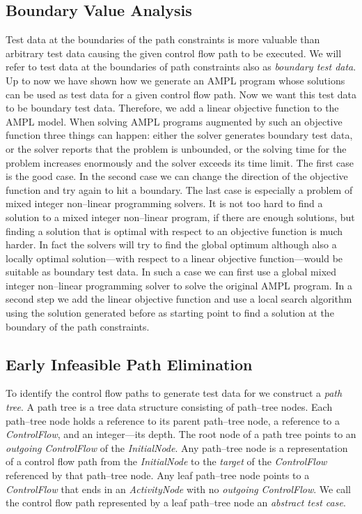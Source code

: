 \documentclass[runningheads,a4paper]{llncs}%
\newcommand{\UMLType}[1]{\textsf{\textit{#1}}} %
\newcommand{\UMLReference}[1]{\textsf{\textit{#1}}} %
\begin{document}
\subsection{Boundary Value Analysis}%
\label{sec:BoundaryValueAnalysis}%
Test data at the boundaries of the path constraints is more valuable than
arbitrary test data causing the given control flow path to be executed. We will
refer to test data at the boundaries of path constraints also as \emph{boundary
test data}. Up to now we have shown how we generate an AMPL program whose
solutions can be used as test data for a given control flow path. Now we want
this test data to be boundary test data. Therefore, we add a linear objective
function to the AMPL model. When solving AMPL programs augmented by such an
objective function three things can happen: either the solver generates boundary
test data, or the solver reports that the problem is unbounded, or the solving
time for the problem increases enormously and the solver exceeds its time limit.
The first case is the good case. In the second case we can change the direction
of the objective function and try again to hit a boundary. The last case is
especially a problem of mixed integer non--linear programming solvers. It is not
too hard to find a solution to a mixed integer non--linear program, if there are
enough solutions, but finding a solution that is optimal with respect to an
objective function is much harder. In fact the solvers will try to find the
global optimum although also a locally optimal solution---with respect to a
linear objective function---would be suitable as boundary test data. In such a
case we can first use a global mixed integer non--linear programming solver to
solve the original AMPL program. In a second step we add the linear objective
function and use a local search algorithm using the solution generated before as
starting point to find a solution at the boundary of the path constraints.
\subsection{Early Infeasible Path Elimination}%
\label{sec:InfeasiblePathElimination}%
To identify the control flow paths to generate test data for we construct a
\emph{path tree}. A path tree is a tree data structure consisting of path--tree
nodes. Each path--tree node holds a reference to its parent path--tree node, a
reference to a \UMLType{ControlFlow}, and an integer---its depth. The root node
of a path tree points to an \UMLReference{outgoing} \UMLType{ControlFlow} of the
\UMLType{InitialNode}. Any path--tree node is a representation of a
control flow path from the \UMLType{InitialNode} to the \UMLReference{target}
of the \UMLType{ControlFlow} referenced by that path--tree node. Any leaf
path--tree node points to a \UMLType{ControlFlow} that ends in an
\UMLType{ActivityNode} with no \UMLReference{outgoing} \UMLType{ControlFlow}. We
call the control flow path represented by a leaf path--tree node an
\emph{abstract test case}.
\end{document}
